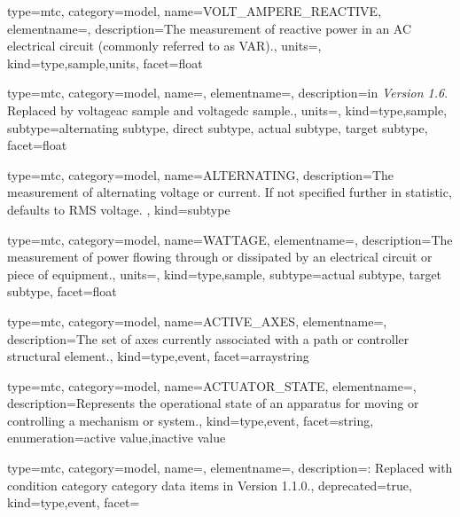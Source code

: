 {
  type=mtc,
  category=model,
  name={VOLT\_AMPERE\_REACTIVE},
  elementname=,
  description={The measurement of reactive power in an AC electrical circuit (commonly referred to as VAR).},
  units=,
  kind={type,sample,units},
  facet={\gls{float}}
}


{
  type=mtc,
  category=model,
  name=,
  elementname=,
  description={\DEPRECATED in \textit{Version 1.6}. Replaced by \gls{voltageac sample} and \gls{voltagedc sample}.},
  units=,
  kind={type,sample},
  subtype={\gls{alternating subtype}, \gls{direct subtype}, \gls{actual subtype}, \gls{target subtype}},
  facet={\gls{float}}
}

{
  type=mtc,
  category=model,
  name={ALTERNATING},
  description={The measurement of alternating voltage or current.   If not specified further in statistic, defaults to RMS voltage. },
  kind={subtype}
}


{
  type=mtc,
  category=model,
  name={WATTAGE},
  elementname=,
  description={The measurement of power flowing through or dissipated by an electrical circuit or piece of equipment.},
  units=,
  kind={type,sample},
  subtype={\gls{actual subtype}, \gls{target subtype}},
  facet={\gls{float}}
}


{
  type=mtc,
  category=model,
  name={ACTIVE\_AXES},
  elementname=,
  description={The set of axes currently associated with a \gls{path} or \gls{controller} \gls{structural element}.},
  kind={type,event},
  facet={\gls{arraystring}}
}


{
  type=mtc,
  category=model,
  name={ACTUATOR\_STATE},
  elementname=,
  description={Represents the operational state of an apparatus for moving or controlling a mechanism or system.},
  kind={type,event},
  facet={\gls{string}},
  enumeration={\gls{active value},\gls{inactive value}}
}


{
  type=mtc,
  category=model,
  name=,
  elementname=,
  description={\DEPRECATED: Replaced with \gls{condition category} category data items in Version 1.1.0.},
  deprecated={true},
  kind={type,event},
  facet={}
}


